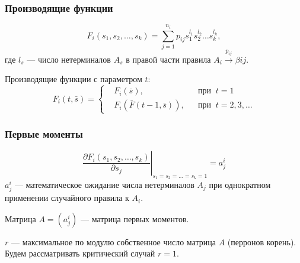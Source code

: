 \documentclass{beamer}
\begin{document}
	\begin{frame}
		\frametitle{Производящие функции}
		\begin{equation*}
			F_i(s_1, s_2, \ldots, s_k) = \sum_{j=1}^{n_i} p_{ij} s_1^{l_1} s_2^{l_2} \ldots s_k^{l_k},
		\end{equation*}
		где $l_s$ --- число нетерминалов $A_s$ в правой части правила $A_i \xrightarrow{p_{ij}} \beta{ij}$.
		\vspace{15pt}
		
		Производящие функции с параметром $t$:
		\begin{equation*}
			F_i(t, \bar{s}) = \left\{
			\begin{split}
				&F_i(\bar{s}),  & &\text{при}\;\; t = 1 \\
				&F_i(\bar{F}(t-1, \bar{s})), & &\text{при}\;\; t = 2,3,\ldots
			\end{split}
			\right.
		\end{equation*}
	\end{frame}
	
	\begin{frame}
		\frametitle{Первые моменты}
		\begin{equation*}
			\left. \frac{\partial F_i(s_1, s_2, \ldots, s_k)}{\partial s_j} \right|_{s_1 = s_2 = \ldots = s_k = 1} = a^i_j
		\end{equation*}
		$a^i_j$ --- математическое ожидание числа нетерминалов $A_j$ при однократном применении случайного правила к $A_i$.
		\vspace{10pt}
		
		Матрица $A = (a^i_j)$ --- матрица первых моментов.
		\vspace{10pt}
		
		$r$ --- максимальное по модулю собственное число матрица $A$ (перронов корень). Будем рассматривать критический случай $r = 1$.
	\end{frame}
	
\end{document}
